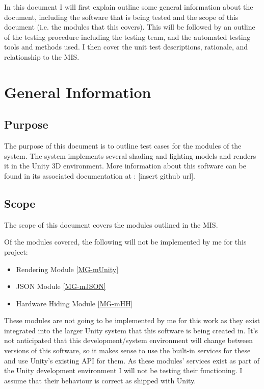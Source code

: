 \documentclass[12pt, titlepage]{article}
\begin{document}
In this document I will first explain outline some general information about 
the document, including the software that is being tested and the scope of this 
document (i.e. the modules that this covers). This will be followed by an 
outline of the testing procedure including the testing team, and the automated 
testing tools and methods used. I then cover the unit test descriptions, 
rationale, and relationship to the MIS.


\section{General Information}

\subsection{Purpose}
The purpose of this document is to outline test cases for the modules of the 
\progname system. The \progname system implements several shading and lighting 
models and renders it in the Unity 3D environment. More information about this 
software can be found in its associated documentation at : [insert github url].

\subsection{Scope}
The scope of this document covers the modules outlined in the MIS. 

Of the modules covered, the following will not be implemented by me for this 
project:

\begin{itemize}
	\item Rendering Module \ref{MG-mUnity}
	\item JSON Module \ref{MG-mJSON}
	\item Hardware Hiding Module \ref{MG-mHH}
\end{itemize}

These modules are not going to be implemented by me for this work as they exist 
integrated into the larger Unity system that this software is being created in. 
It's not anticipated that this development/system environment will change 
between versions of this software, so it makes sense to use the built-in 
services for these and use Unity's existing API for them. As these modules' 
services exist as part of the Unity development environment I will not be 
testing their functioning. I assume that their behaviour is correct as shipped 
with Unity.
\end{document}
